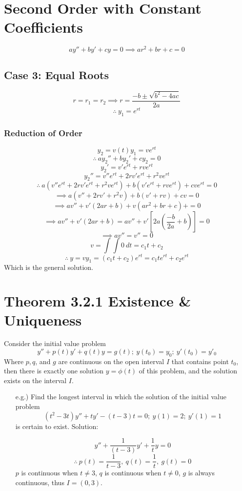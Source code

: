 \documentclass[12pt]{article}
\begin{document}
\pagestyle{fancy}
\fancyhead{}

\normalsize
\section*{Second Order with Constant Coefficients}
\[ay''+by'+cy=0\implies ar^2+br+c=0\]
\subsection*{Case 3: Equal Roots}
\[r=r_1=r_2\implies r=\frac{-b\pm\sqrt{b^2-4ac}}{2a}\]
\[\therefore\ y_1=e^{rt}\]
\subsubsection*{Reduction of Order}
\[y_2=v(t)y_1=ve^{rt}\]
\[\therefore\ ay_2''+by_2'+cy_2=0\]
\[y_2'=v'e^{rt}+rve^{rt}\]
\[y_2''=v''e^{rt}+2rv'e^{rt}+r^2ve^{rt}\]
\[\therefore\ a(v''e^{rt}+2rv'e^{rt}+r^2ve^{rt})+b(v'e^{rt}+rve^{rt})+cve^{rt}=0\]
\[\implies a(v''+2rv'+r^2v)+b(v'+rv)+cv=0\]
\[\implies av''+v'(2ar+b)+v(ar^2+br+c)+=0\]
\[\implies av''+v'(2ar+b)=av''+v'\left[2a\left(\frac{-b}{2a}+b\right)\right]=0\]
\[\implies av''=v''=0\]
\[v=\int\int0\ dt=c_1t+c_2\]
\[\therefore\ y=vy_1=(c_1t+c_2)e^{rt}=c_1te^{rt}+c_2e^{rt}\]
Which is the general solution.

\section*{Theorem 3.2.1 Existence \& Uniqueness}
Consider the initial value problem
\[y''+p(t)y'+q(t)y=g(t);\ y(t_0)=y_0;\ y'(t_0)=y'_0\]
Where $p,q$, and $g$ are continuous on the open interval $I$ that contains point $t_0$, then there is exactly one solution $y=\phi(t)$ of this problem, and the solution exists on the interval $I$.

\begin{itemize}
    \item [e.g.)] Find the longest interval in which the solution of the initial value problem
          \[(t^2-3t)y''+ty'-(t-3)t=0;\ y(1)=2;\ y'(1)=1\]
          is certain to exist.\newline
          Solution:

          \[y''+\frac{1}{(t-3)}y'+\frac{1}{t}y=0\]
          \[\therefore\ p(t)=\frac{1}{t-3},\ q(t)=\frac{1}{t},\ g(t)=0\]
          $p$ is continuous when $t\neq3$, $q$ is continuous when $t\neq0$, $g$ is always continuous, thus $I=(0,3)$.
\end{itemize}
\end{document}
